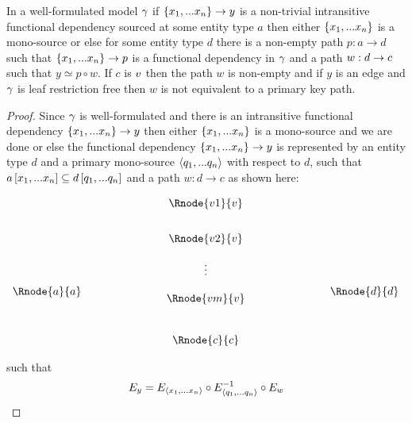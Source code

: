 \begin{lemma}
In a well-formulated model $\gamma$  if $\left\{x_1,...x_n\right\} \rightarrow y$  is a non-trivial intransitive 
functional dependency sourced at some entity type $a$ then either $\left\{x_1,...x_n\right\}$ is a mono-source
or else for some entity type $d$ there is a non-empty  path $p:a \rightarrow d$ such that $\{x_1,...x_n\} \rightarrow p$ is a functional dependency in $\gamma$
and a  path $w:d \rightarrow c$  such that $y \simeq p \circ w$. If $c$ is $v$ then
the path $w$ is non-empty and if $y$ is an edge and $\gamma$ is leaf restriction free then $w$ is not equivalent to a primary key path.
\end{lemma}
\begin{proof}
Since $\gamma$ is well-formulated  and there is an intransitive functional dependency $\left\{x_1,...x_n\right\} \rightarrow y$ then either $\left\{x_1,...x_n\right\}$ is a mono-source and we are done or else the functional dependency
$\left\{x_1,...x_n\right\} \rightarrow y$   is represented 
by  an entity type $d$ and 
a primary mono-source $\langle q_1,...q_n\rangle$ with respect to
$d$, such that $a\left[x_1,...x_n\right]\subseteq d\left[q_1,...q_n\right]$ and a 
path $w:d\rightarrow c$ as shown here:

\setlength{\arraycolsep}{.2cm}
\begin{center}
$
\begin{array}{cp{2cm}c p{2cm} c}
             &  & \Rnode{v1}{\veee} & &               \\ [0.7cm]
						 &  & \Rnode{v2}{\veee} & &               \\ [0.4cm]
						 &  &     \vdots      & &               \\ [0.2cm]
\Rnode{a}{a} &  &                 & & \Rnode{d}{d}  \\ [-0.2cm]
             &  & \Rnode{vm}{\veee} & &               \\ [0.9cm]
             &  & \Rnode{c}{c}    & &               \\
\end{array}
$
\end{center}
such that
\begin{equation}
\label{fundependency}
E_y = E_{\langle x_1,...x_n\rangle} \circ E_{\langle q_1,...q_n\rangle}^{-1} \circ E_w
\end{equation}


\end{proof}
